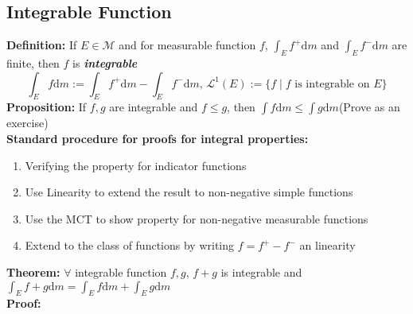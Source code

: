 \documentclass{article}
\newcommand{\0}{{\bf{0}}}
\newcommand{\1}{{\bf{1}}}
\newcommand{\dint}{\displaystyle\int}
\newcommand{\dif}{\mbox{d}}
\begin{document}
\subsection{Integrable Function}
\textbf{Definition:} If $E\in\mathcal{M}$ and for measurable function $f$, $\dint_Ef^+\dif m$ and $\dint_Ef^-\dif m$ are finite, then $f$ is \textit{\textbf{integrable}}
$$\int_Ef\dif m:=\int_Ef^+\dif m-\int_Ef^-\dif m,\,\mathcal{L}^1(E):=\{f\mid f\mbox{ is integrable on }E\}$$
\textbf{Proposition:} If $f,g$ are integrable and $f\le g$, then $\dint f\dif m\le\int g\dif m$\quad(Prove as an exercise)\\
\textbf{Standard procedure for proofs for integral properties:}
\begin{enumerate}
    \item Verifying the property for indicator functions
    \item Use Linearity to extend the result to non-negative simple functions
    \item Use the MCT to show property for non-negative measurable functions
    \item Extend to the class of functions by writing $f=f^+-f^-$ an linearity
\end{enumerate}
\textbf{Theorem:} $\forall$ integrable function $f,g$, $f+g$ is integrable and $\dint_Ef+g\dif m=\dint_Ef\dif m+\dint_Eg\dif m$\\
\textbf{Proof:}
\end{document}

